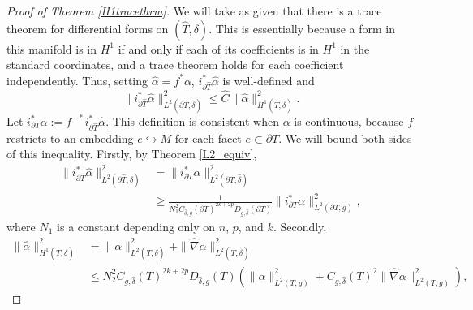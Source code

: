 \documentclass[10pt,a4paper]{amsart}
\begin{document}
\begin{proof}[Proof of Theorem \ref{H1tracethrm}]
We will take as given that there is a trace theorem for differential forms on $(\hat T, \delta)$. This is essentially because a form in this manifold is in $H^1$ if and only if each of its coefficients is in $H^1$ in the standard coordinates, and a trace theorem holds for each coefficient independently. Thus, setting $\hat \alpha = f^*\alpha$, $i_{\partial \hat T}^* \hat \alpha$ is well-defined and
\begin{equation}\label{basictraceeqn}
\|i_{\partial \hat T}^*\hat \alpha\|^2_{L^2(\partial \hat T,\delta)} \le \hat C \|\hat \alpha\|^2_{H^1(\hat T, \delta)}.
\end{equation}
Let $i_{\partial T}^*\alpha := f^{-*}i_{\partial \hat T}^*\hat \alpha$. This definition is consistent when $\alpha$ is continuous, because $f$ restricts to an embedding $e \hookrightarrow M$ for each facet $e \subset \partial T$. We will bound both sides of this inequality. Firstly, by Theorem \ref{L2_equiv},
\begin{align*}
\|i_{\partial \hat T}^*\hat\alpha\|^2_{L^2(\partial \hat T,\delta)} &= \|i_{\partial T}^*\alpha\|_{L^2(\partial T,\hat \delta)}^2 \\
&\ge \frac{1}{N_1^2C_{\hat \delta,g}(\partial T)^{2k + 2p}D_{g,\hat \delta}(\partial T)}\|i_{\partial T}^*\alpha\|_{L^2(\partial T,g)}^2,
\end{align*}
where $N_1$ is a constant depending only on $n$, $p$, and $k$.
Secondly,
\begin{align*}
\|\hat{\alpha}\|^2_{H^1(\hat T, \delta)} &= \|\alpha\|^2_{L^2(T,\hat \delta)} + \|\hat\nabla\alpha\|^2_{L^2(T,\hat \delta)}\\
&\le N_2^2C_{g,\hat \delta}(T)^{2k + 2p}D_{\hat \delta,g}(T)\left(\|\alpha\|_{L^2(T,g)}^2 + C_{g,\hat \delta}(T)^2\|\hat\nabla\alpha\|_{L^2(T,g)}^2\right),

\end{align*}
\end{proof}
\end{document}
